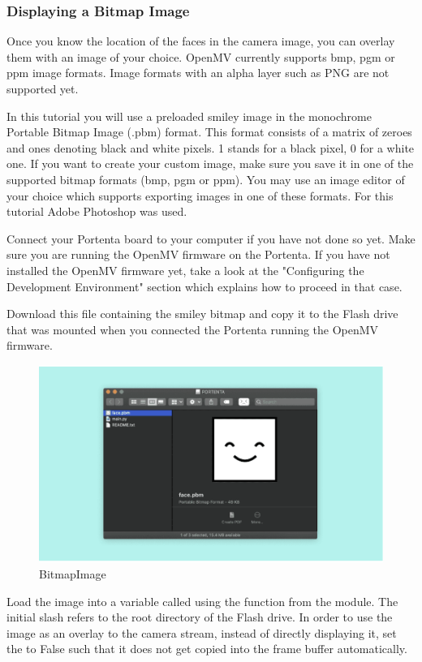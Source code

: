 \subsubsection{Displaying a Bitmap Image} Once you know the location of the faces in the camera image, you can overlay them with an image of your choice. OpenMV currently supports bmp, pgm or ppm image formats. Image formats with an alpha layer such as PNG are not supported yet.

In this tutorial you will use a preloaded smiley image in the monochrome Portable Bitmap Image (.pbm) format. This format consists of a matrix of zeroes and ones denoting black and white pixels. 1 stands for a black pixel, 0 for a white one. If you want to create your custom image, make sure you save it in one of the supported bitmap formats (bmp, pgm or ppm). You may use an image editor of your choice which supports exporting images in one of these formats. For this tutorial Adobe Photoshop was used.

Connect your Portenta board to your computer if you have not done so yet. Make sure you are running the OpenMV firmware on the Portenta. If you have not installed the OpenMV firmware yet, take a look at the "Configuring the Development Environment" section which explains how to proceed in that case.

Download this file containing the smiley bitmap and copy it to the Flash drive that was mounted when you connected the Portenta running the OpenMV firmware. \cite{portentaFaceFilter:2024}

\begin{figure}
	\begin{center}
		\includegraphics[width=0.7\linewidth]{Images/VisionShield/BitmapImage.png}
		\caption{BitmapImage}
		\label{BitmapImage}
	\end{center}
\end{figure}

Load the image into a variable called  using the  function from the  module. The initial slash refers to the root directory of the Flash drive. In order to use the image as an overlay to the camera stream, instead of directly displaying it, set the  to False such that it does not get copied into the frame buffer automatically.

